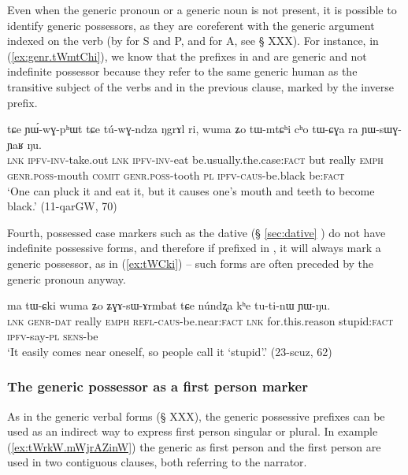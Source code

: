 Even when the generic pronoun or a generic noun is not present, it is possible to identify generic possessors, as they are coreferent with the generic argument indexed on the verb (by  for S and P, and  for A, see § XXX). For instance, in (\ref{ex:genr.tWmtChi}), we know that  the  prefixes in  and   are generic and not indefinite possessor because they refer to the same generic human as the transitive subject of the verbs  and  in the previous clause, marked by the inverse prefix.

\begin{exe}
\ex  \label{ex:genr.tWmtChi}
\gll
tɕe ɲɯ́-wɣ-pʰɯt tɕe tú-wɣ-ndza ŋgrɤl ri, wuma ʑo tɯ-mtɕʰi cʰo tɯ-ɕɣa ra ɲɯ-sɯɣ-ɲaʁ ŋu. \\
\textsc{lnk} \textsc{ipfv}-\textsc{inv}-take.out \textsc{lnk} \textsc{ipfv}-\textsc{inv}-eat be.usually.the.case:\textsc{fact} but really \textsc{emph}  \textsc{genr.poss}-mouth \textsc{comit} \textsc{genr.poss}-tooth \textsc{pl}  \textsc{ipfv}-\textsc{caus}-be.black be:\textsc{fact} \\
\glt `One can pluck it and eat it, but it causes one's mouth and teeth to become black.' (11-qarGW, 70) 
\end{exe}

Fourth, possessed case markers such as the dative  (§ \ref{sec:dative} ) do not have indefinite possessive forms, and therefore if prefixed in , it will always mark a generic possessor, as in (\ref{ex:tWCki}) -- such forms are often preceded by the generic pronoun  anyway.

\begin{exe}
\ex  \label{ex:tWCki}
\gll ma tɯ-ɕki wuma ʑo ʑɣɤ-sɯ-ɤrmbat tɕe núndʐa kʰe tu-ti-nɯ ɲɯ-ŋu. \\
\textsc{lnk} \textsc{genr-dat} really \textsc{emph} \textsc{refl}-\textsc{caus}-be.near:\textsc{fact} \textsc{lnk} for.this.reason stupid:\textsc{fact} \textsc{ipfv}-say-\textsc{pl} \textsc{sens}-be \\
\glt `It easily comes near oneself, so people call it `stupid'.' (23-scuz, 62) 
\end{exe}

\subsubsection{The generic possessor as a first person marker} \label{sec:generic.tW.1sg}
As in the generic verbal forms (§ XXX), the generic possessive prefixes can be used as an indirect way to express first person singular or plural. In example (\ref{ex:tWrkW.mWjrAZinW}) the generic as first person and the first person are used in two contiguous clauses, both referring to the narrator.

